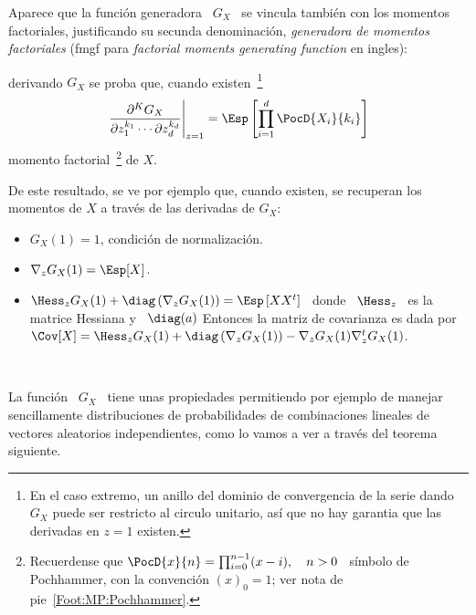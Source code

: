 Aparece  que la  funci\'on generadora  \ $G_X$  \ se  vincula tambi\'en  con los
momentos factoriales, justificando su secunda denominaci\'on, {\em generadora de
  momentos factoriales}  (fmgf para {\em factorial  moments generating function}
en ingles):
%
\begin{lema}
\label{Lem:MP:GeneracionMomentosFactoriales}
%
  derivando $G_X$ se proba que,  cuando existen~\footnote{En el caso extremo, un
    anillo  del  dominio de  convergencia  de la  serie  dando  $G_X$ puede  ser
    restricto al circulo  unitario, as\'i que no hay  garantia que las derivadas
    en $z = 1$ existen.}
  \[
  \left.\frac{\partial^K     G_X}{\partial     z_1^{k_1}     \cdots     \partial
      z_d^{k_d}}\right|_{z=1} = \Esp\left[ \prod_{i=1}^d \PocD{X_i}{k_i} \right]
  \]
  momento  factorial~\footnote{Recuerdense que $\PocD{x}{n}  = \prod_{i=0}^{n-1}
    (x-i), \quad n > 0$ \  s\'imbolo de Pochhammer, con la convenci\'on $(x)_0 =
    1$; ver nota de pie~\ref{Foot:MP:Pochhammer}.} de $X$.
\end{lema}

De  este resultado,  se ve  por ejemplo  que, cuando  existen, se  recuperan los
momentos de $X$ a trav\'es de las derivadas de $G_X$:
%
\begin{itemize}
\item $G_X(1) = 1$, condici\'on de normalizaci\'on.
%
\item $\nabla_z G_X(1) = \Esp[X]$.
%
\item $\Hess_z G_X(1)  + \diag\left( \nabla_z G_X(1) \right)  = \Esp\left[ X X^t
  \right]$  \  donde  \ $\Hess_z$  \  es  la  matrice  Hessiana y  \  $\diag(a)$
  Entonces la  matriz de covarianza  es dada por  \ $\Cov[X] = \Hess_z  G_X(1) +
  \diag\left( \nabla_z G_X(1) \right) - \nabla_z G_X(1) \nabla_z^t G_X(1)$.
\end{itemize}

\

La funci\'on \ $G_X$ \ tiene unas propiedades permitiendo por ejemplo de manejar
sencillamente  distribuciones  de probabilidades  de  combinaciones lineales  de
vectores aleatorios independientes,  como lo vamos a ver  a trav\'es del teorema
siguiente.

